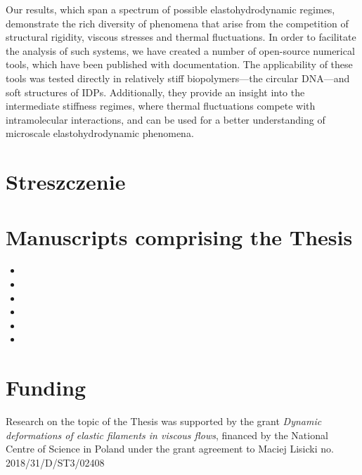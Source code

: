 \documentclass[physics]{doctoral}
\begin{document}
Our results, which span a spectrum of possible elastohydrodynamic regimes, demonstrate the rich diversity of phenomena that arise from the competition of structural rigidity, viscous stresses and thermal fluctuations.
In order to facilitate the analysis of such systems, we have created a number of open-source numerical tools, which have been published with documentation.
The applicability of these tools was tested directly in relatively stiff biopolymers---the circular DNA---and soft structures of IDPs.
Additionally, they provide an insight into the intermediate stiffness regimes, where thermal fluctuations compete with intramolecular interactions, and can be used for a better understanding of microscale elastohydrodynamic phenomena.
\clearpage

\section*{Streszczenie}

\clearpage

\section*{Manuscripts comprising the Thesis}

\begin{itemize}
    \item {}
    \item {}
    \item {}
    \item {}
    \item {}
    \item {}
\end{itemize}

\vspace*{\fill}

\section*{Funding}
Research on the topic of the Thesis was supported by the grant \emph{Dynamic deformations of elastic filaments in viscous flows}, financed by the National Centre of Science in Poland under the grant agreement to Maciej Lisicki no.
2018/31/D/ST3/02408
\clearpage

\tableofcontents
\end{document}
